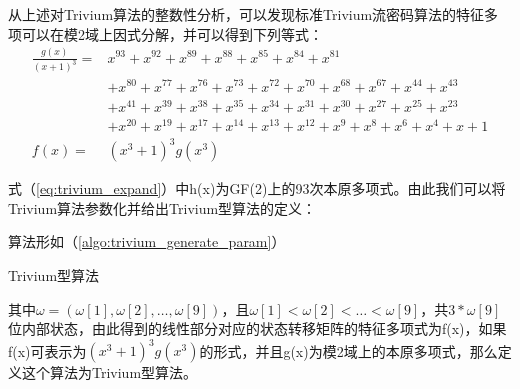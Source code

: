 从上述对Trivium算法的整数性分析，可以发现标准Trivium流密码算法的特征多项可以在模2域上因式分解，并可以得到下列等式：
\[\begin{split}
\frac{g(x)}{(x+1)^3}=&x^{93}+x^{92}+x^{89}+x^{88}+x^{85}+x^{84}+x^{81}\\
&+x^{80}+x^{77}+x^{76}+x^{73}+x^{72}+x^{70}+x^{68}+x^{67}+x^{44}+x^{43}\\
&+x^{41}+x^{39}+x^{38}+x^{35}+x^{34}+x^{31}+x^{30}+x^{27}+x^{25}+x^{23}\\
&+x^{20}+x^{19}+x^{17}+x^{14}+x^{13}+x^{12}+x^9+x^8+x^6+x^4+x+1\\
f(x)=&(x^3+1)^3g(x^3)
\end{split}\]
\begin{equation}
\label{eq:trivium_expand}
\end{equation}

式（\ref{eq:trivium_expand}）中h(x)为GF(2)上的93次本原多项式。由此我们可以将Trivium算法参数化并给出Trivium型算法的定义：
\begin{defn}[Trivium型算法的定义]
\label{defn:trivium}

算法形如（\ref{algo:trivium_generate_param}）

\begin{algorithm}[H]
\caption{Trivium型算法}
\label{algo:trivium_generate_param}
\begin{algorithmic}
    \ENDFOR
  \ENDFOR
\end{algorithmic}
\end{algorithm}

其中$\omega = (\omega[1], \omega[2], \ldots, \omega[9])$，且$\omega[1] < \omega[2] < \ldots < \omega[9]$，共$3*\omega[9]$位内部状态，由此得到的线性部分对应的状态转移矩阵的特征多项式为f(x)，如果f(x)可表示为$(x^{3}+1)^{3}g(x^{3})$的形式，并且g(x)为模2域上的本原多项式，那么定义这个算法为Trivium型算法。

\end{defn}

